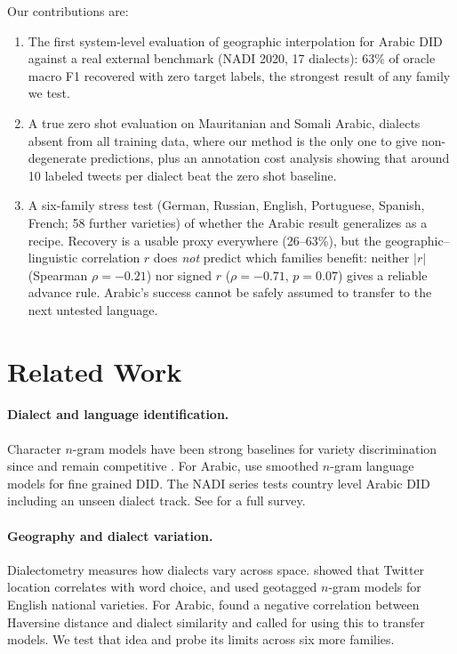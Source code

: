 \documentclass[11pt]{article}
\begin{document}
Our contributions are:
\begin{enumerate}[leftmargin=*,topsep=2pt]
\item The first system-level evaluation of geographic interpolation for Arabic DID against a real external benchmark (NADI 2020, 17 dialects): 63\% of oracle macro F1 recovered with zero target labels, the strongest result of any family we test.
\item A true zero shot evaluation on Mauritanian and Somali Arabic, dialects absent from all training data, where our method is the only one to give non-degenerate predictions, plus an annotation cost analysis showing that around 10 labeled tweets per dialect beat the zero shot baseline.
\item A six-family stress test (German, Russian, English, Portuguese, Spanish, French; 58 further varieties) of whether the Arabic result generalizes as a recipe. Recovery is a usable proxy everywhere (26--63\%), but the geographic--linguistic correlation $r$ does \emph{not} predict which families benefit: neither $|r|$ (Spearman $\rho{=}{-}0.21$) nor signed $r$ ($\rho{=}{-}0.71$, $p{=}0.07$) gives a reliable advance rule. Arabic's success cannot be safely assumed to transfer to the next untested language.
\end{enumerate}

\section{Related Work}
\label{sec:related}

\paragraph{Dialect and language identification.}
Character $n$-gram models have been strong baselines for variety discrimination since \citet{cavnar-trenkle-1994-ngram} and remain competitive \cite{tiedemann-ljubesic-2012-efficient,zampieri-etal-2014-report}.
For Arabic, \citet{salameh-etal-2018-fine} use smoothed $n$-gram language models for fine grained DID.
The NADI series \cite{abdul-mageed-etal-2020-nadi, abdul-mageed-etal-2024-nadi} tests country level Arabic DID including an unseen dialect track.
See \citet{jauhiainen-etal-2019-automatic} for a full survey.

\paragraph{Geography and dialect variation.}
Dialectometry \cite{nerbonne-heeringa-1997-measuring,nerbonne-2010-dialectometry} measures how dialects vary across space.
\citet{eisenstein-etal-2010-latent} showed that Twitter location correlates with word choice, and \citet{lui-cook-2013-classifying} used geotagged $n$-gram models for English national varieties.
For Arabic, \citet{alsudais-etal-2022-similarities} found a negative correlation between Haversine distance and dialect similarity and called for using this to transfer models.
We test that idea and probe its limits across six more families.
\end{document}
